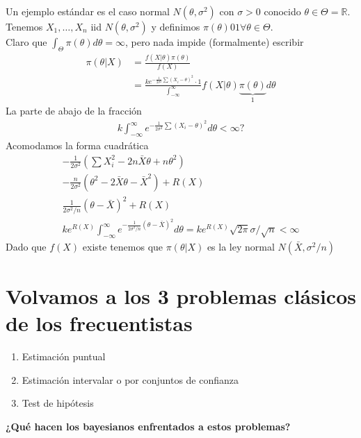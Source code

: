 \documentclass[10pt]{article}
\theoremstyle{plain}
\theoremstyle{definition}
\begin{document}
Un ejemplo estándar es el caso normal $N(\theta,\sigma^2)$ con $\sigma>0$ conocido $\theta \in \Theta = \mathbb{R}$. Tenemos $X_{1},\ldots,X_{n}$ iid $N(\theta,\sigma^2)$ y definimos $\pi(\theta)0 1  \forall \theta \in \Theta$.\\

Claro que $\int_{\Theta}\pi(\theta)d\theta = \infty$, pero nada impide (formalmente) escribir
\begin{align*}
\pi(\theta|X) &= \frac{f(X|\theta)\pi(\theta)}{f(X)}\\
&= \frac{ke^{-\frac{1}{2\sigma^2}\sum (X_{i}-\theta)^2}\cdot 1}{\int_{-\infty}^{\infty}}f(X|\theta) \underbrace{\pi(\theta)}_{1}d\theta
\end{align*}
La parte de abajo de la fracción
\begin{align*}
k\int_{-\infty}^{\infty}e^{-\frac{1}{2\sigma^2}\sum (X_{i}-\theta)^2}d\theta < \infty ?
\end{align*}
Acomodamos la forma cuadrática
\begin{align*}
-\frac{1}{2\sigma^2}\left(\sum X_{i}^2 - 2n\bar{X}\theta+ n \theta^2\right)\\
-\frac{n}{2\sigma^2}\left(\theta^2-2\bar{X}\theta-\bar{X}^2\right) + R(X)\\
\frac{1}{2\sigma^2/n}(\theta-\bar{X})^2 + R(X)\\
ke^{R(X)}\int_{-\infty}^{\infty}e^{-\frac{1}{2\sigma^2/n}(\theta-\bar{X})^2}d\theta = k e^{R(X)}\sqrt{2\pi}\sigma/\sqrt{n} < \infty
\end{align*}
Dado que $f(X)$ existe tenemos que $\pi(\theta|X)$ es la ley normal $N(\bar{X}, \sigma^2/n)$
\section{Volvamos a los 3 problemas clásicos de los frecuentistas}
\begin{enumerate}
\item Estimación puntual
\item Estimación intervalar o por conjuntos de confianza
\item Test de hipótesis
\end{enumerate}
\textbf{¿Qué hacen los bayesianos enfrentados a estos problemas?}\\
\end{document}
